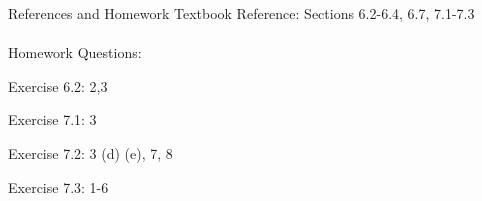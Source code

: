 \documentclass{./../../Latex/teaching_slides}
\begin{document}
\begin{frame}{References and Homework}
Textbook Reference: Sections 6.2-6.4, 6.7, 7.1-7.3 \\~\\
Homework Questions: \\ \vspace{0.5em}
\begin{witemize}
  \item Exercise 6.2: 2,3
  \item Exercise 7.1: 3
  \item Exercise 7.2: 3 (d) (e), 7, 8
  \item Exercise 7.3: 1-6
\end{witemize}
\end{frame}

\end{document}
